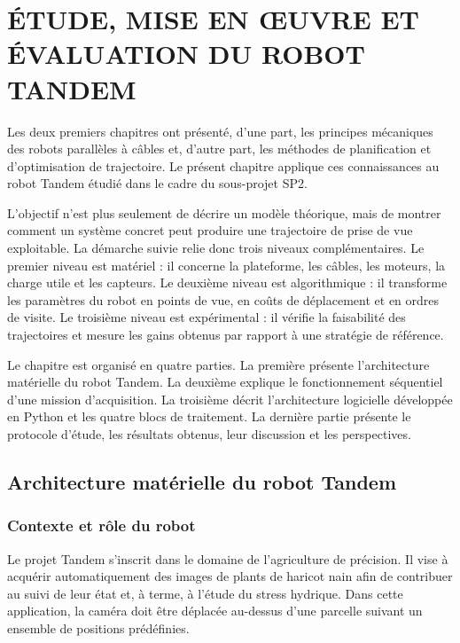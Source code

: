 \chapter{ÉTUDE, MISE EN ŒUVRE ET ÉVALUATION DU ROBOT TANDEM}
\label{chap:etude_tandem}

Les deux premiers chapitres ont présenté, d'une part, les principes mécaniques des robots parallèles à câbles et, d'autre part, les méthodes de planification et d'optimisation de trajectoire. Le présent chapitre applique ces connaissances au robot Tandem étudié dans le cadre du sous-projet SP2.

L'objectif n'est plus seulement de décrire un modèle théorique, mais de montrer comment un système concret peut produire une trajectoire de prise de vue exploitable. La démarche suivie relie donc trois niveaux complémentaires. Le premier niveau est matériel : il concerne la plateforme, les câbles, les moteurs, la charge utile et les capteurs. Le deuxième niveau est algorithmique : il transforme les paramètres du robot en points de vue, en coûts de déplacement et en ordres de visite. Le troisième niveau est expérimental : il vérifie la faisabilité des trajectoires et mesure les gains obtenus par rapport à une stratégie de référence.

Le chapitre est organisé en quatre parties. La première présente l'architecture matérielle du robot Tandem. La deuxième explique le fonctionnement séquentiel d'une mission d'acquisition. La troisième décrit l'architecture logicielle développée en Python et les quatre blocs de traitement. La dernière partie présente le protocole d'étude, les résultats obtenus, leur discussion et les perspectives.

\section{Architecture matérielle du robot Tandem}
\label{sec:architecture_materielle}

\subsection{Contexte et rôle du robot}

Le projet Tandem s'inscrit dans le domaine de l'agriculture de précision. Il vise à acquérir automatiquement des images de plants de haricot nain afin de contribuer au suivi de leur état et, à terme, à l'étude du stress hydrique. Dans cette application, la caméra doit être déplacée au-dessus d'une parcelle suivant un ensemble de positions prédéfinies.

